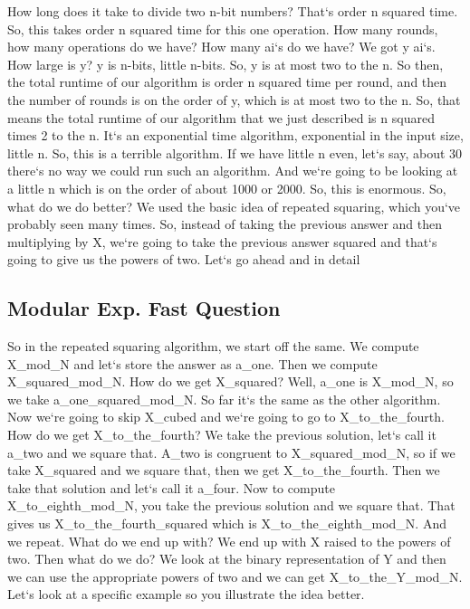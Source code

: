 How long does it take to divide two n-bit numbers? That`s order n squared time.
So, this takes order n squared time for this one operation.
How many rounds, how many operations do we have? How many ai`s do we have? We got y ai`s.
How large is y? y is n-bits, little n-bits.
So, y is at most two to the n.
So then, the total runtime of our algorithm is order n squared time per round, and then the number of rounds is on the order of y, which is at most two to the n.
So, that means the total runtime of our algorithm that we just described is n squared times 2 to the n.
It`s an exponential time algorithm, exponential in the input size, little n.
So, this is a terrible algorithm.
If we have little n even, let`s say, about 30 there`s no way we could run such an algorithm.
And we`re going to be looking at a little n which is on the order of about 1000 or 2000.
So, this is enormous.
So, what do we do better? We used the basic idea of repeated squaring, which you`ve probably seen many times.
So, instead of taking the previous answer and then multiplying by X, we`re going to take the previous answer squared and that`s going to give us the powers of two.
Let`s go ahead and in detail

\subsection{Modular Exp.  Fast Question}
So in the repeated squaring algorithm, we start off the same.
We compute X\_mod\_N and let`s store the answer as a\_one.
Then we compute X\_squared\_mod\_N\@.
How do we get X\_squared? Well, a\_one is X\_mod\_N, so we take a\_one\_squared\_mod\_N\@.
So far it`s the same as the other algorithm.
Now we`re going to skip X\_cubed and we`re going to go to X\_to\_the\_fourth.
How do we get X\_to\_the\_fourth? We take the previous solution, let`s call it a\_two and we square that.
A\_two is congruent to X\_squared\_mod\_N, so if we take X\_squared and we square that, then we get X\_to\_the\_fourth.
Then we take that solution and let`s call it a\_four.
Now to compute X\_to\_eighth\_mod\_N, you take the previous solution and we square that.
That gives us X\_to\_the\_fourth\_squared which is X\_to\_the\_eighth\_mod\_N\@.
And we repeat.
What do we end up with? We end up with X raised to the powers of two.
Then what do we do? We look at the binary representation of Y and then we can use the appropriate powers of two and we can get X\_to\_the\_Y\_mod\_N\@.
Let`s look at a specific example so you illustrate the idea better.

